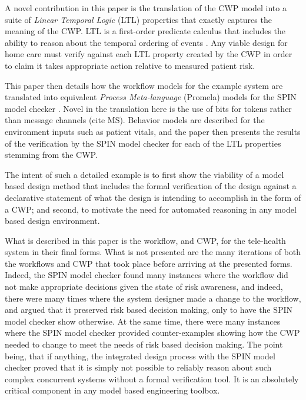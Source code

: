 A novel contribution in this paper is the translation of the CWP model into a suite of \emph{Linear Temporal Logic} (LTL) properties that exactly captures the meaning of the CWP. LTL is a first-order predicate calculus that includes the ability to reason about the temporal ordering of events \cite{10.5555/975331}. Any viable design for home care must verify against each LTL property created by the CWP in order to claim it takes appropriate action relative to measured patient risk.

This paper then details how the workflow models for the example system are translated into equivalent \emph{Process Meta-language} (Promela) models for the SPIN model checker \cite{spin}. Novel in the translation here is the use of bits for tokens rather than message channels (cite MS). Behavior models are described for the environment inputs such as patient vitals, and the paper then presents the results of the verification by the SPIN model checker for each of the LTL properties stemming from the CWP. 

The intent of such a detailed example is to first show the viability of a model based design method that includes the formal verification of the design against a declarative statement of what the design is intending to accomplish in the form of a CWP; and second, to motivate the need for automated reasoning in any model based design environment.  

What is described in this paper is the workflow, and CWP, for the tele-health system in their final forms. What is not presented are the many iterations of both the workflows and CWP that took place before arriving at the presented forms. Indeed, the SPIN model checker found many instances where the workflow did not make appropriate decisions given the state of risk awareness, and indeed, there were many times where the system designer made a change to the workflow, and argued that it preserved risk based decision making, only to have the SPIN model checker show otherwise. At the same time, there were many instances where the SPIN model checker provided counter-examples showing how the CWP needed to change to meet the needs of risk based decision making. The point being, that if anything, the integrated design process with the SPIN model checker proved that it is simply not possible to reliably reason about such complex concurrent systems without a formal verification tool. It is an absolutely critical component in any model based engineering toolbox.
